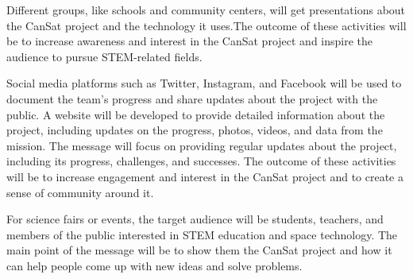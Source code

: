 Different groups, like schools and community centers, will get presentations about the CanSat project and the technology it uses.The outcome of these activities will be to increase awareness and interest in the CanSat project and inspire the audience to pursue STEM-related fields.

Social media platforms such as Twitter, Instagram, and Facebook will be used to document the team's progress and share updates about the project with the public. A website will be developed to provide detailed information about the project, including updates on the progress, photos, videos, and data from the mission. The message will focus on providing regular updates about the project, including its progress, challenges, and successes. The outcome of these activities will be to increase engagement and interest in the CanSat project and to create a sense of community around it.

For science fairs or events, the target audience will be students, teachers, and members of the public interested in STEM education and space technology. The main point of the message will be to show them the CanSat project and how it can help people come up with new ideas and solve problems. 



